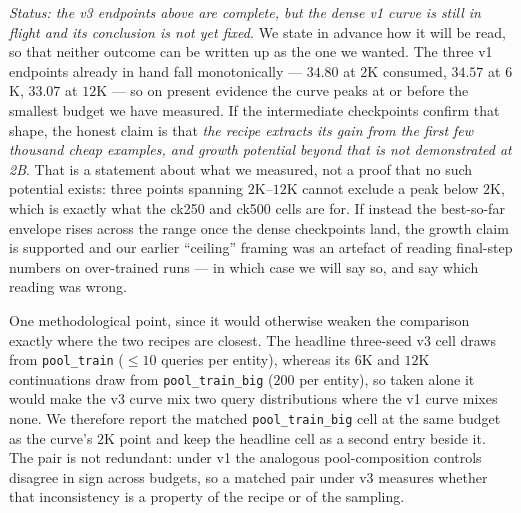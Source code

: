 \emph{Status: the v3 endpoints above are complete, but the dense v1 curve is still in flight and
its conclusion is not yet fixed.} We state in advance how it will be read, so that neither outcome
can be written up as the one we wanted.
The three v1 endpoints already in hand fall monotonically --- $34.80$ at $2$K consumed, $34.57$
at $6$K, $33.07$ at $12$K --- so on present evidence the curve peaks at or before the smallest
budget we have measured. If the intermediate checkpoints confirm that shape, the honest claim is
that \emph{the recipe extracts its gain from the first few thousand cheap examples, and growth
potential beyond that is not demonstrated at 2B}. That is a statement about what we measured, not
a proof that no such potential exists: three points spanning $2$K--$12$K cannot exclude a peak
below $2$K, which is exactly what the ck250 and ck500 cells are for. If instead the best-so-far
envelope rises across the range once the dense checkpoints land, the growth claim is supported
and our earlier ``ceiling'' framing was an artefact of reading final-step numbers on over-trained
runs --- in which case we will say so, and say which reading was wrong.

One methodological point, since it would otherwise weaken the comparison exactly where the two
recipes are closest. The headline three-seed v3 cell draws from \texttt{pool\_train}
($\leq 10$ queries per entity), whereas its $6$K and $12$K continuations draw from
\texttt{pool\_train\_big} ($200$ per entity), so taken alone it would make the v3 curve mix two
query distributions where the v1 curve mixes none. We therefore report the matched
\texttt{pool\_train\_big} cell at the same budget as the curve's $2$K point and keep the headline
cell as a second entry beside it. The pair is not redundant: under v1 the analogous
pool-composition controls disagree in sign across budgets, so a matched pair under v3 measures
whether that inconsistency is a property of the recipe or of the sampling.

